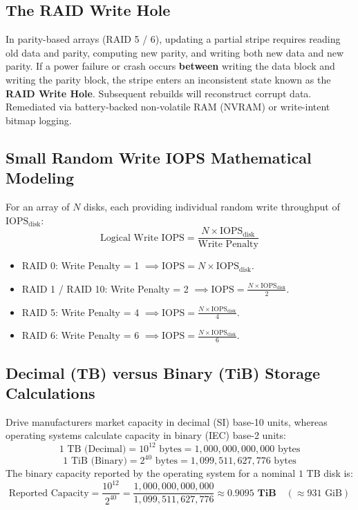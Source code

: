 \subsection{The RAID Write Hole}
In parity-based arrays (RAID 5 / 6), updating a partial stripe requires reading old data and parity, computing new parity, and writing both new data and new parity. If a power failure or crash occurs \textbf{between} writing the data block and writing the parity block, the stripe enters an inconsistent state known as the \textbf{RAID Write Hole}. Subsequent rebuilds will reconstruct corrupt data. Remediated via battery-backed non-volatile RAM (NVRAM) or write-intent bitmap logging.

\subsection{Small Random Write IOPS Mathematical Modeling}
For an array of $N$ disks, each providing individual random write throughput of $\text{IOPS}_{\text{disk}}$:
\begin{equation}
\boxed{\text{Logical Write IOPS} = \frac{N \times \text{IOPS}_{\text{disk}}}{\text{Write Penalty}}}
\end{equation}
\begin{itemize}
    \item RAID 0: Write Penalty = 1 $\implies \text{IOPS} = N \times \text{IOPS}_{\text{disk}}$.
    \item RAID 1 / RAID 10: Write Penalty = 2 $\implies \text{IOPS} = \frac{N \times \text{IOPS}_{\text{disk}}}{2}$.
    \item RAID 5: Write Penalty = 4 $\implies \text{IOPS} = \frac{N \times \text{IOPS}_{\text{disk}}}{4}$.
    \item RAID 6: Write Penalty = 6 $\implies \text{IOPS} = \frac{N \times \text{IOPS}_{\text{disk}}}{6}$.
\end{itemize}

\subsection{Decimal (TB) versus Binary (TiB) Storage Calculations}
Drive manufacturers market capacity in decimal (SI) base-10 units, whereas operating systems calculate capacity in binary (IEC) base-2 units:
\begin{equation}
1\text{ TB (Decimal)} = 10^{12}\text{ bytes} = 1,000,000,000,000\text{ bytes}
\end{equation}
\begin{equation}
1\text{ TiB (Binary)} = 2^{40}\text{ bytes} = 1,099,511,627,776\text{ bytes}
\end{equation}
The binary capacity reported by the operating system for a nominal $1\text{ TB}$ disk is:
\begin{equation}
\text{Reported Capacity} = \frac{10^{12}}{2^{40}} = \frac{1,000,000,000,000}{1,099,511,627,776} \approx \mathbf{0.9095\text{ TiB}} \quad (\approx 931\text{ GiB})
\end{equation}

